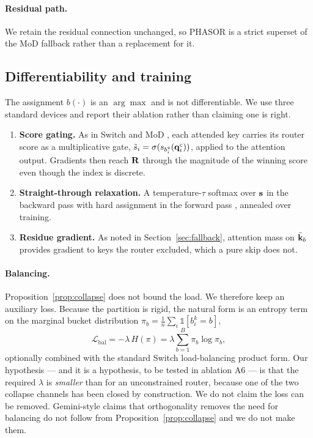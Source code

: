 \paragraph{Residual path.} We retain the residual connection unchanged, so PHASOR is a strict superset of the MoD fallback rather than a replacement for it.

\subsection{Differentiability and training}
\label{sec:balance}

The assignment $b(\cdot)$ is an $\arg\max$ and is not differentiable. We use three standard devices and report their ablation rather than claiming one is right.

\begin{enumerate}
\item \textbf{Score gating.} As in Switch \citep{fedus2022switch} and MoD \citep{raposo2024mixture}, each attended key carries its router score as a multiplicative gate, $\tilde s_i = \sigma(s_{b^q_i}(\mathbf{q}^{\mathrm{c}}_i))$, applied to the attention output. Gradients then reach $\mathbf{R}$ through the magnitude of the winning score even though the index is discrete.
\item \textbf{Straight-through relaxation.} A temperature-$\tau$ softmax over $\mathbf{s}$ in the backward pass with hard assignment in the forward pass \citep{bengio2013ste,jang2017gumbel,maddison2017concrete}, annealed over training.
\item \textbf{Residue gradient.} As noted in Section~\ref{sec:fallback}, attention mass on $\bar{\mathbf{k}}_b$ provides gradient to keys the router excluded, which a pure skip does not.
\end{enumerate}

\paragraph{Balancing.} Proposition~\ref{prop:collapse} does not bound the load. We therefore keep an auxiliary loss. Because the partition is rigid, the natural form is an entropy term on the marginal bucket distribution $\pi_b = \tfrac{1}{n}\sum_i \mathbb{1}[b^k_i = b]$,
\begin{equation}
  \mathcal{L}_{\text{bal}} = -\lambda \, H(\pi) = \lambda \sum_{b=1}^{B} \pi_b \log \pi_b ,
\end{equation}
optionally combined with the standard Switch load-balancing product form. Our hypothesis --- and it is a hypothesis, to be tested in ablation A6 --- is that the required $\lambda$ is \emph{smaller} than for an unconstrained router, because one of the two collapse channels has been closed by construction. We do not claim the loss can be removed. Gemini-style claims that orthogonality removes the need for balancing do not follow from Proposition~\ref{prop:collapse} and we do not make them.


